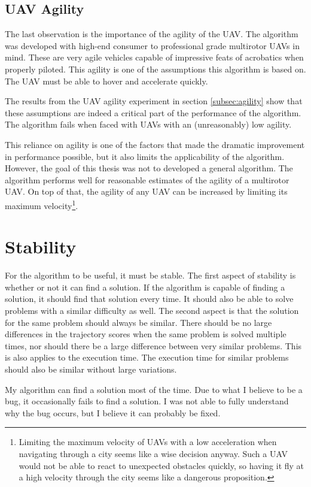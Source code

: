 \subsection{UAV Agility} 
The last observation is the importance of the agility of the UAV. The algorithm was developed with high-end consumer to professional grade multirotor UAVs in mind. These are very agile vehicles capable of impressive feats of acrobatics when properly piloted. This agility is one of the assumptions this algorithm is based on. The UAV must be able to hover and accelerate quickly.
\par
The results from the UAV agility experiment in section \ref{subsec:agility} show that these assumptions are indeed a critical part of the performance of the algorithm. The algorithm fails when faced with UAVs with an (unreasonably) low agility. 
\par
This reliance on agility is one of the factors that made the dramatic improvement in performance possible, but it also limits the applicability of the algorithm. However, the goal of this thesis was not to developed a general algorithm. The algorithm performs well for reasonable estimates of the agility of a multirotor UAV. On top of that, the agility of any UAV can be increased by limiting its maximum velocity\footnote{Limiting the maximum velocity of UAVs with a low acceleration when navigating through a city seems like a wise decision anyway. Such a UAV would not be able to react to unexpected obstacles quickly, so having it fly at a high velocity through the city seems like a dangerous proposition.}.


\section{Stability}
For the algorithm to be useful, it must be stable. The first aspect of stability is whether or not it can find a solution. If the algorithm is capable of finding a solution, it should find that solution every time. It should also be able to solve problems with a similar difficulty as well. The second aspect is that the solution for the same problem should always be similar. There should be no large differences in the trajectory scores when the same problem is solved multiple times, nor should there be a large difference between very similar problems. This is also applies to the execution time. The execution time for similar problems should also be similar without large variations.
\par
My algorithm can find a solution most of the time. Due to what I believe to be a bug, it occasionally fails to find a solution. I was not able to fully understand why the bug occurs, but I believe it can probably be fixed.  

